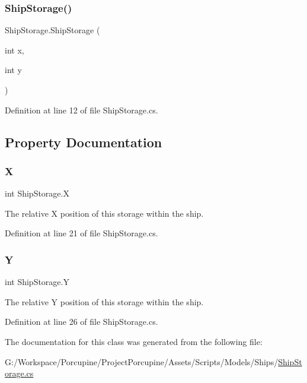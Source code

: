 \subsubsection{\texorpdfstring{Ship\+Storage()}{ShipStorage()}}
{\footnotesize\ttfamily Ship\+Storage.\+Ship\+Storage (\begin{DoxyParamCaption}\item[{int}]{x,  }\item[{int}]{y }\end{DoxyParamCaption})}



Definition at line 12 of file Ship\+Storage.\+cs.



\subsection{Property Documentation}
\mbox{\label{class_ship_storage_ae980dd2d3f9bc510605408a7753e6ec6}} 
\subsubsection{\texorpdfstring{X}{X}}
{\footnotesize\ttfamily int Ship\+Storage.\+X\hspace{0.3cm}{\ttfamily [get]}}



The relative X position of this storage within the ship. 



Definition at line 21 of file Ship\+Storage.\+cs.

\mbox{\label{class_ship_storage_ab1cdbe24121b5e9714bbce330c0c11be}} 
\subsubsection{\texorpdfstring{Y}{Y}}
{\footnotesize\ttfamily int Ship\+Storage.\+Y\hspace{0.3cm}{\ttfamily [get]}}



The relative Y position of this storage within the ship. 



Definition at line 26 of file Ship\+Storage.\+cs.



The documentation for this class was generated from the following file\+:\begin{DoxyCompactItemize}
\item 
G\+:/\+Workspace/\+Porcupine/\+Project\+Porcupine/\+Assets/\+Scripts/\+Models/\+Ships/\hyperlink{_ship_storage_8cs}{Ship\+Storage.\+cs}\end{DoxyCompactItemize}
